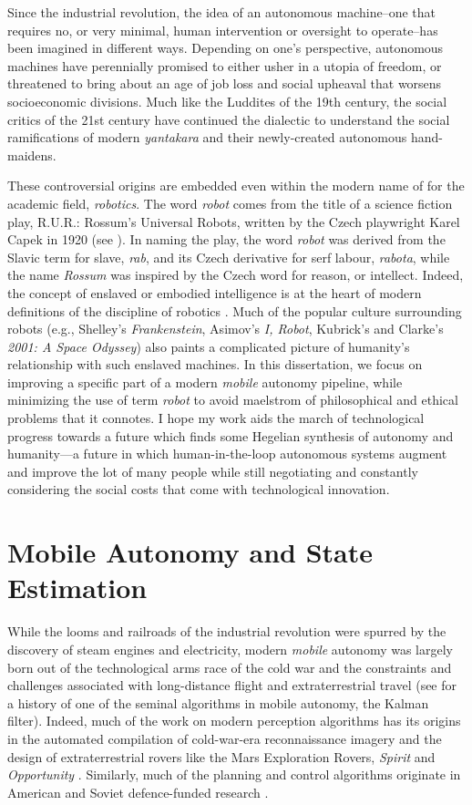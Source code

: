 Since the industrial revolution, the idea of an autonomous machine--one that requires no, or very minimal, human intervention or oversight to operate--has been imagined in different ways. Depending on one's perspective, autonomous machines have perennially promised to either usher in a utopia of freedom, or threatened to bring about an age of job loss and social upheaval that worsens socioeconomic divisions. Much like the Luddites of the 19th century, the social critics of the 21st century have continued the dialectic to understand the social ramifications of modern \textit{yantakara} and their newly-created autonomous hand-maidens.

These controversial origins are embedded even within the modern name of for the academic field, \textit{robotics}. The word \textit{robot} comes from the title of a science fiction play, R.U.R.: Rossum's Universal Robots, written by the Czech playwright Karel Capek in 1920 (see ). In naming the play, the word \textit{robot} was derived from the Slavic term for slave, \textit{rab}, and its Czech derivative for serf labour, \textit{rabota}, while the name \textit{Rossum} was inspired by the Czech word for reason, or intellect. Indeed, the concept of enslaved or embodied  intelligence is at the heart of modern definitions of the discipline of robotics \citep{Redfield2019-pi}. Much of the popular culture surrounding robots (e.g., Shelley's \textit{Frankenstein}, Asimov's \textit{I, Robot}, Kubrick's and Clarke's \textit{2001: A Space Odyssey}) also paints a complicated picture of humanity's relationship with such enslaved machines. In this dissertation, we focus on improving a specific part of a modern \textit{mobile} autonomy pipeline, while minimizing the use of term \textit{robot} to avoid maelstrom of philosophical and ethical problems that it connotes. I hope my work aids the march of technological progress towards a future which finds some Hegelian synthesis of autonomy and humanity---a future in which human-in-the-loop autonomous systems augment and improve the lot of many people while still negotiating and constantly considering the social costs that come with technological innovation.

\section{Mobile Autonomy and State Estimation}
While the looms and railroads of the industrial revolution were spurred by the discovery of steam engines and electricity, modern \textit{mobile} autonomy was largely born out of the technological arms race of the cold war and the constraints and challenges associated with long-distance flight and extraterrestrial travel (see \cite{Grewal2010-ts} for a history of one of the seminal algorithms in mobile autonomy, the Kalman filter). Indeed, much of the work on modern perception algorithms has its origins in the automated compilation of cold-war-era reconnaissance imagery and the design of extraterrestrial rovers like the Mars Exploration Rovers, \textit{Spirit} and \textit{Opportunity} \citep{Scaramuzza2011-qr}. Similarly, much of the planning and control algorithms originate in American and Soviet defence-funded research \citep{Nilsson1984-oc,Thrun2006-hb}.

